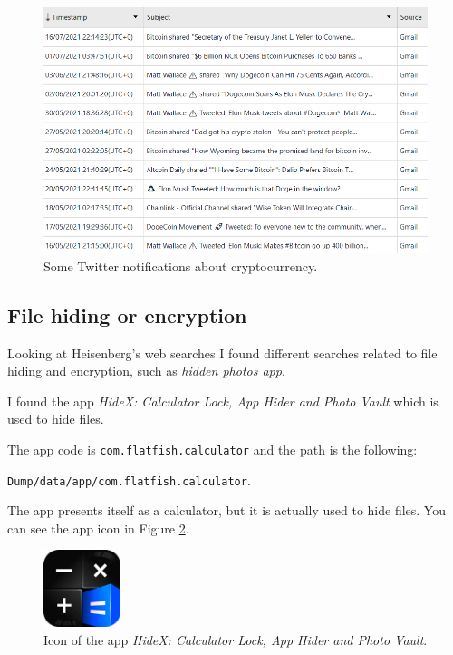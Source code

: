 \documentclass[12pt]{article}
\begin{document}
\begin{figure}[!ht]
    \centering
    \includegraphics[width=\textwidth]{images/gmail-crypto.png}
    \caption{Some Twitter notifications about cryptocurrency.}
    \label{fig:twitter}
\end{figure}

\subsection{File hiding or encryption}
\label{sec:file-hiding}

Looking at Heisenberg's web searches I found different searches related to file hiding and encryption, such as \textit{hidden photos app}.

I found the app \textit{HideX: Calculator Lock, App Hider and Photo Vault} \cite{calculator} which is used to hide files.

The app code is \texttt{com.flatfish.calculator} and the path is the following:

\texttt{Dump/data/app/com.flatfish.calculator}. 

The app presents itself as a calculator, but it is actually used to hide files. You can see the app icon in Figure \ref{fig:calc}.

\begin{figure}[!ht]
    \centering
    \includegraphics[width=0.2\textwidth]{images/icon.png}
    \caption{Icon of the app \textit{HideX: Calculator Lock, App Hider and Photo Vault}.}
    \label{fig:calc}
\end{figure}
\end{document}
